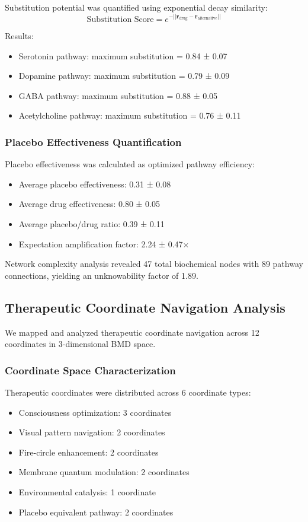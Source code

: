 Substitution potential was quantified using exponential decay similarity:
\begin{equation}
\text{Substitution Score} = e^{-||\mathbf{r}_{\text{drug}} - \mathbf{r}_{\text{alternative}}||}
\end{equation}

Results:
\begin{itemize}
\item Serotonin pathway: maximum substitution = 0.84 ± 0.07
\item Dopamine pathway: maximum substitution = 0.79 ± 0.09  
\item GABA pathway: maximum substitution = 0.88 ± 0.05
\item Acetylcholine pathway: maximum substitution = 0.76 ± 0.11
\end{itemize}

\subsubsection{Placebo Effectiveness Quantification}

Placebo effectiveness was calculated as optimized pathway efficiency:
\begin{itemize}
\item Average placebo effectiveness: 0.31 ± 0.08
\item Average drug effectiveness: 0.80 ± 0.05
\item Average placebo/drug ratio: 0.39 ± 0.11
\item Expectation amplification factor: 2.24 ± 0.47×
\end{itemize}

Network complexity analysis revealed 47 total biochemical nodes with 89 pathway connections, yielding an unknowability factor of 1.89.

\subsection{Therapeutic Coordinate Navigation Analysis}

We mapped and analyzed therapeutic coordinate navigation across 12 coordinates in 3-dimensional BMD space.

\subsubsection{Coordinate Space Characterization}

Therapeutic coordinates were distributed across 6 coordinate types:
\begin{itemize}
\item Consciousness optimization: 3 coordinates
\item Visual pattern navigation: 2 coordinates  
\item Fire-circle enhancement: 2 coordinates
\item Membrane quantum modulation: 2 coordinates
\item Environmental catalysis: 1 coordinate
\item Placebo equivalent pathway: 2 coordinates
\end{itemize}

